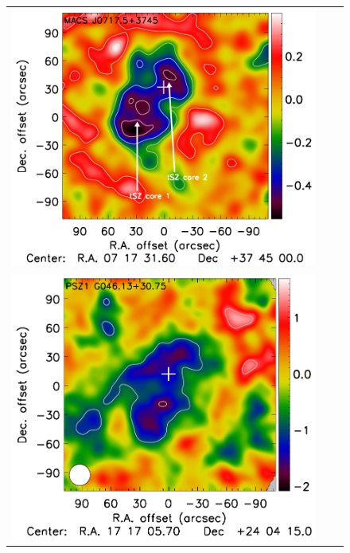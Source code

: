 \documentclass[traditabstract]{aa}
\begin{document}
\begin{figure}[p]
{\begin{tabular}{lll}
\includegraphics[trim=2.3cm 2.2cm 0cm 0cm, clip=true, scale=1]{Figure/DoG_MACSJ0717_15_15_45.pdf} \\
\includegraphics[trim=0cm 2.2cm 0cm 0cm, clip=true, scale=1]{Figure/Map_PSZ1G046.pdf} & 

\end{tabular}}
\end{figure}
\end{document}
